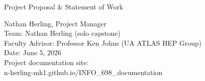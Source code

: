 \newcommand{\specialnote}[1]{%
  \par\medskip\noindent
  \setlength{\fboxsep}{9pt}%
  \begin{center}
  \fcolorbox{forgeamber}{white}{%
    \begin{minipage}{\dimexpr0.92\linewidth-2\fboxsep\relax}
      {\footnotesize\bfseries\color{forgeamber}SPECIAL NOTE}\\[3pt]%
      {\small\itshape\color{forgemute} #1}%
    \end{minipage}}%
  \end{center}
  \par\medskip}



\forgemasthead
  {\forgeexpansion}
  {Project Proposal \& Statement of Work}

\vspace{22pt}
\begin{center}
  {\Large Nathan Herling, Project Manager}\\[12pt]
  {\Large Team: Nathan Herling \textnormal{(solo capstone)}}\\[12pt]
  {\Large Faculty Advisor: Professor Ken Johns \textnormal{(UA ATLAS HEP Group)}}\\[12pt]
  {\Large Date: June 5, 2026}\\[14pt]
  {\normalsize Project documentation site:\\
           {n-herling-mk1.github.io/INFO\_698\_documentation}}
\end{center}

\vspace{20pt}

